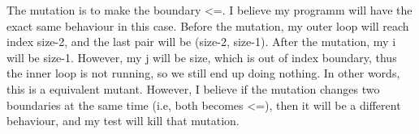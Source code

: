 \documentclass[12pt]{article}
\begin{document}
The mutation is to make the boundary <=. I believe my programm will have the exact same behaviour in this case. Before the mutation, my outer loop will reach index size-2, and the last pair will be (size-2, size-1). After the mutation, my i will be size-1. However, my j will be size, which is out of index boundary, thus the inner loop is not running, so we still end up doing nothing. In other words, this is a equivalent mutant. However, I believe if the mutation changes two boundaries at the same time (i.e, both becomes <=), then it will be a different behaviour, and my test will kill that mutation. 
\end{document}

